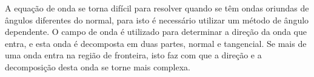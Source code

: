 % 
% 
% 
% 

A equação de onda se torna difícil para resolver quando se têm ondas oriundas de ângulos diferentes do normal, para isto é necessário utilizar um método de ângulo dependente. O campo de onda é utilizado para determinar a direção da onda que entra, e esta onda é decomposta em duas partes, normal e tangencial. Se mais de uma onda entra na região de fronteira, isto faz com que a direção e a decomposição desta onda se torne mais complexa.

